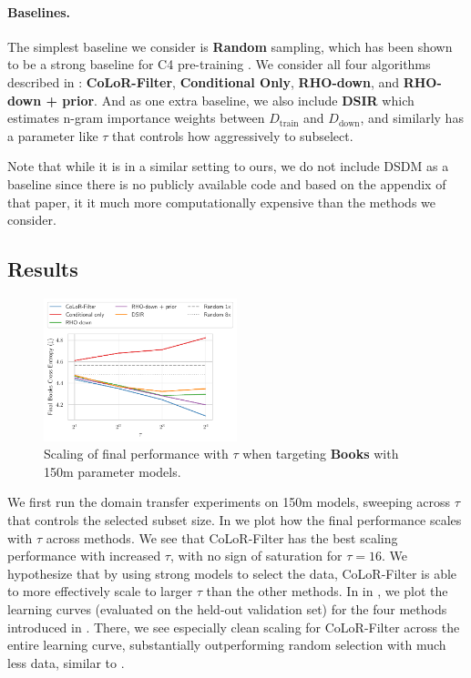 \documentclass{article}
\newcommand{\Ddown}{D_{\text{down}}}
\newcommand{\Dtrain}{D_{\text{train}}}
\begin{document}
\paragraph{Baselines.} The simplest baseline we consider is \textbf{Random} sampling, which has been shown to be a strong baseline for C4 pre-training \citep{engstrom2024dsdm}. We consider all four algorithms described in : \textbf{CoLoR-Filter}, 
 \textbf{Conditional Only}, \textbf{RHO-down}, and \textbf{RHO-down + prior}. And as one extra baseline, we also include \textbf{DSIR} \citep{xie2023data} which estimates n-gram importance weights between $ \Dtrain$ and $ \Ddown$, and similarly has a parameter like $ \tau$ that controls how aggressively to subselect.

Note that while it is in a similar setting to ours, we do not include DSDM \citep{engstrom2024dsdm} as a baseline since there is no publicly available code and based on the appendix of that paper, it it much more computationally expensive than the methods we consider.




\subsection{Results}




\begin{figure}
    \centering
    \vspace{-1.5cm}
    \includegraphics[width=0.5\textwidth]{images/books_tau.pdf}
    \vspace{-0.6cm}
    \caption{Scaling of final performance with $ \tau$ when targeting \textbf{Books} with 150m parameter models. %
    }
    \label{fig:books_tau}
\end{figure}


We first run the domain transfer experiments on 150m models, sweeping across $ \tau$ that controls the selected subset size. 
In  we plot how the final performance scales with $ \tau$ across methods. We see that CoLoR-Filter has the best scaling performance with increased $ \tau$, with no sign of saturation for $ \tau = 16$. We hypothesize that by using strong models to select the data, CoLoR-Filter is able to more effectively scale to larger $ \tau$ than the other methods.
In  in , we plot the learning curves (evaluated on the held-out validation set) for the four methods introduced in . There, we see especially clean scaling for CoLoR-Filter across the entire learning curve, substantially outperforming random selection with much less data, similar to .
\end{document}
